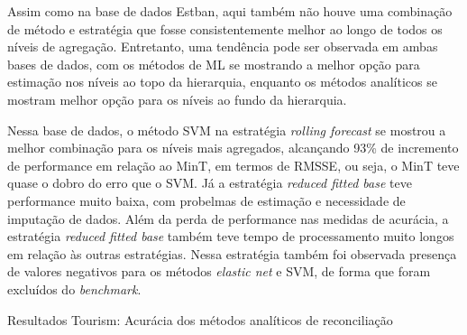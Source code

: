 \begin{apendicesenv}
Assim como na base de dados Estban, aqui também não houve uma combinação
de método e estratégia que fosse consistentemente melhor ao longo de
todos os níveis de agregação. Entretanto, uma tendência pode ser
observada em ambas bases de dados, com os métodos de ML se mostrando a
melhor opção para estimação nos níveis ao topo da hierarquia, enquanto
os métodos analíticos se mostram melhor opção para os níveis ao fundo da
hierarquia.

Nessa base de dados, o método SVM na estratégia \emph{rolling forecast}
se mostrou a melhor combinação para os níveis mais agregados, alcançando
93\% de incremento de performance em relação ao MinT, em termos de
RMSSE, ou seja, o MinT teve quase o dobro do erro que o SVM. Já a estratégia \emph{reduced fitted base} teve performance muito baixa, com probelmas de estimação e necessidade de imputação de dados. Além da perda de performance nas medidas de acurácia, a estratégia \emph{reduced fitted base} também teve tempo de processamento muito longos em relação às outras estratégias. Nessa estratégia também foi observada presença de valores negativos para os métodos \emph{elastic net} e SVM, de forma que foram excluídos do \emph{benchmark}.

\hypertarget{tbl-tourism-results-analiticos}{}
\begin{table}
\caption{\label{tbl-tourism-results-analiticos}Resultados Tourism: Acurácia dos métodos analíticos de reconciliação }\tabularnewline


\end{table}
\end{apendicesenv}
